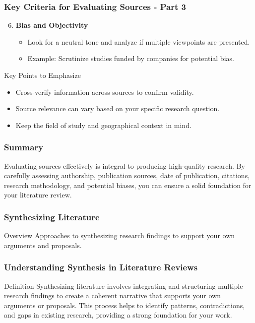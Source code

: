 \documentclass[aspectratio=169]{beamer}
\begin{document}
\begin{frame}[fragile]
    \frametitle{Key Criteria for Evaluating Sources - Part 3}
    \begin{enumerate}
        \setcounter{enumi}{5}  %
        \item \textbf{Bias and Objectivity}
        \begin{itemize}
            \item Look for a neutral tone and analyze if multiple viewpoints are presented.
            \item Example: Scrutinize studies funded by companies for potential bias.
        \end{itemize}
    \end{enumerate}
    
    \begin{block}{Key Points to Emphasize}
        \begin{itemize}
            \item Cross-verify information across sources to confirm validity.
            \item Source relevance can vary based on your specific research question.
            \item Keep the field of study and geographical context in mind.
        \end{itemize}
    \end{block}
\end{frame}

\begin{frame}[fragile]
    \frametitle{Summary}
    Evaluating sources effectively is integral to producing high-quality research. By carefully assessing authorship, publication sources, date of publication, citations, research methodology, and potential biases, you can ensure a solid foundation for your literature review.
\end{frame}

\begin{frame}[fragile]
    \frametitle{Synthesizing Literature}
    \begin{block}{Overview}
        Approaches to synthesizing research findings to support your own arguments and proposals.
    \end{block}
\end{frame}

\begin{frame}[fragile]
    \frametitle{Understanding Synthesis in Literature Reviews}
    \begin{block}{Definition}
        Synthesizing literature involves integrating and structuring multiple research findings to create a coherent narrative that supports your own arguments or proposals. This process helps to identify patterns, contradictions, and gaps in existing research, providing a strong foundation for your work.
    \end{block}
\end{frame}
\end{document}
